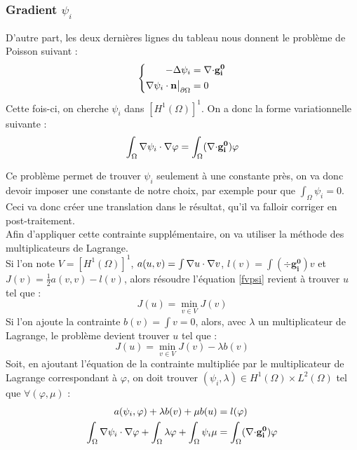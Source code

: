 \subsubsection{Gradient $\psi_i$}
\label{multLagrange}

D'autre part, les deux dernières lignes du tableau nous donnent le problème de Poisson suivant :
\begin{equation}
\label{psi}
\left\{
\begin{aligned}
-{\Delta}\psi_i &= {\nabla\cdot} \mathbf{g_i^0}\\
{\nabla}\psi_i\cdot \mathbf{n}{\big\rvert_{\partial\Omega}} &= 0
\end{aligned}
\right.
\end{equation}
Cette fois-ci, on cherche $\psi_i$ dans $[H^1(\Omega)]^1$. On a donc la forme variationnelle suivante :
\begin{equation}
\label{fvpsi}
\int_\Omega {\nabla}\psi_i\cdot{\nabla}\varphi = \int_\Omega ({\nabla\cdot} \mathbf{g_i^0})\varphi
\end{equation}

Ce problème permet de trouver $\psi_i$ seulement à une constante près, on va donc devoir imposer une constante de notre choix, par exemple pour que $\int_\Omega \psi_i = 0$. Ceci va donc créer une translation dans le résultat, qu'il va falloir corriger en post-traitement.\\
Afin d'appliquer cette contrainte supplémentaire, on va utiliser la méthode des multiplicateurs de Lagrange.\\
Si l'on note $V=[H^1(\Omega)]^1$, $a(u,v)=\int {\nabla} u \cdot {\nabla} v$, $l(v)=\int (\div \mathbf{g_i^0})v$ et $J(v)=\frac{1}{2}a(v,v)-l(v)$, alors résoudre l'équation \ref{fvpsi} revient à trouver $u$ tel que :
\[
J(u) = \min_{v\in V} J(v)
\]
Si l'on ajoute la contrainte $b(v) = \int v = 0$, alors, avec $\lambda$ un multiplicateur de Lagrange, le problème devient trouver $u$ tel que :
\[
J(u) = \min_{v\in V} J(v) - \lambda b(v)
\]
Soit, en ajoutant l'équation de la contrainte multipliée par le multiplicateur de Lagrange correspondant à $\varphi$, on doit trouver $(\psi_i,\lambda)\in H^1(\Omega)\times L^2(\Omega)$ tel que $\forall (\varphi,\mu)$ :
\begin{align}
\label{fvpsiml}
a(\psi_i,\varphi) + \lambda b(v) + \mu b(u) &= l(\varphi) \notag \\
\int_\Omega {\nabla}\psi_i\cdot{\nabla}\varphi + \int_\Omega \lambda\varphi + \int_\Omega \psi_i\mu &= \int_\Omega ({\nabla\cdot} \mathbf{g_i^0})\varphi
\end{align}

